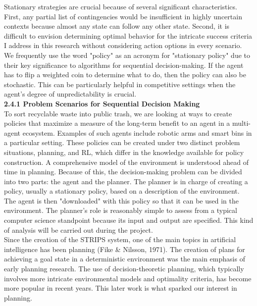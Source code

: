 \documentclass[a4paper,11pt,onecolumn]{article}
\begin{document}
Stationary strategies are crucial because of several significant characteristics. First, any partial list of contingencies would be insufficient in highly uncertain contexts because almost any state can follow any other state. Second, it is difficult to envision determining optimal behavior for the intricate success criteria I address in this research without considering action options in every scenario. We frequently use the word "policy" as an acronym for "stationary policy" due to their key significance to algorithms for sequential decision-making. If the agent has to flip a weighted coin to determine what to do, then the policy can also be stochastic. This can be particularly helpful in competitive settings when the agent's degree of unpredictability is crucial.\newline \\
\textbf{2.4.1 Problem Scenarios for Sequential Decision Making} \\
To sort recyclable waste into public trash, we are looking at ways to create policies that maximize a measure of the long-term benefit to an agent in a multi-agent ecosystem. Examples of such agents include robotic arms and smart bins in a particular setting. These policies can be created under two distinct problem situations, planning, and RL, which differ in the knowledge available for policy construction. A comprehensive model of the environment is understood ahead of time in planning. Because of this, the decision-making problem can be divided into two parts: the agent and the planner. The planner is in charge of creating a policy, usually a stationary policy, based on a description of the environment. The agent is then "downloaded" with this policy so that it can be used in the environment. The planner's role is reasonably simple to assess from a typical computer science standpoint because its input and output are specified. This kind of analysis will be carried out during the project.\\
Since the creation of the STRIPS system, one of the main topics in artificial intelligence has been planning (Fike & Nilsson, 1971). The creation of plans for achieving a goal state in a deterministic environment was the main emphasis of early planning research. The use of decision-theoretic planning, which typically involves more intricate environmental models and optimality criteria, has become more popular in recent years. This later work is what sparked our interest in planning.\newline \\
\end{document}
